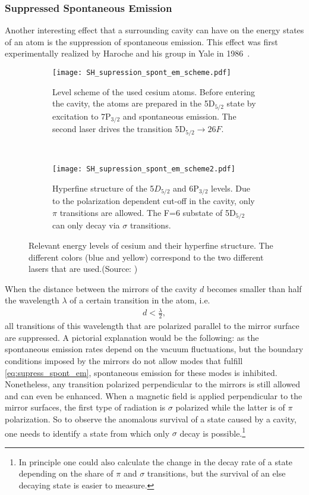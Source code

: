 \subsubsection{Suppressed Spontaneous Emission}
Another interesting effect that a surrounding cavity can have on the energy
states of an atom is the suppression of spontaneous emission. This effect was
first experimentally realized by Haroche and his group in Yale in
1986~\cite{haroche1987SupressedEmission}. 
\begin{figure}[h]
  \centering
  \begin{subfigure}[t]{.48\linewidth}
    \centering
    \texttt{[image: SH\_supression\_spont\_em\_scheme.pdf]}
    \caption{Level scheme of the used cesium atoms. Before entering the cavity,
    the atoms are prepared in the 5D$_{5/2}$ state by excitation to 7P$_{3/2}$
    and spontaneous emission. The second laser drives the transition
  5D$_{5/2} \rightarrow 26F$.}
    \label{fig:supression_scheme1}
  \end{subfigure}
  ~
  \begin{subfigure}[t]{.48\linewidth}
    \centering
    \texttt{[image: SH\_supression\_spont\_em\_scheme2.pdf]}
    \caption{Hyperfine structure of the 5$D_{5/2}$ and 6P$_{3/2}$ levels. Due to
    the polarization dependent cut-off in the cavity, only $\pi$ transitions are
    allowed. The F=6 substate of 5D$_{5/2}$ can only decay via
  $\sigma$ transitions.}
  \label{fig:supression_scheme2}
  \end{subfigure}
  \caption{Relevant energy levels of cesium and their hyperfine structure. The
  different colors (blue and yellow) correspond to the two different lasers that
are used.(Source: \cite{haroche1987SupressedEmission})}
\end{figure}
When the distance between the mirrors
of the cavity $d$ becomes smaller than half the wavelength $\lambda$ of a
certain transition in the atom, i.e.
\begin{align}
  \label{eq:supress_spont_em}
  d < \frac{\lambda}{2},
\end{align}
all transitions of this wavelength that are polarized 
parallel to the mirror surface are suppressed. A pictorial explanation would be
the following: as the spontaneous emission rates depend on the vacuum
fluctuations, but the boundary conditions imposed by the mirrors do not allow
modes that fulfill \eqref{eq:supress_spont_em}, spontaneous emission for
these modes is inhibited. Nonetheless, any  transition polarized
perpendicular to the mirrors is still allowed and can even be enhanced. When a
magnetic field is applied perpendicular to the mirror surfaces, the first type
of radiation is $\sigma$ polarized while the latter is of $\pi$ polarization. So to
observe the anomalous survival of a state caused by a cavity, one needs to
identify a state from which only $\sigma$ decay is possible.\footnote{In
principle one could also calculate the change in the decay rate of a state
depending on the share of $\pi$ and $\sigma$ transitions, but the survival of an
else decaying state is easier to measure.}

